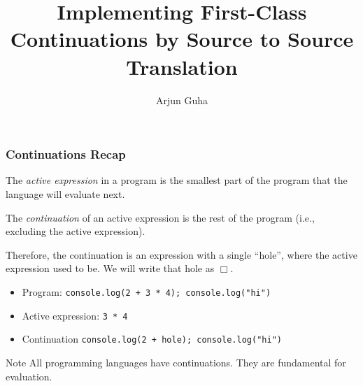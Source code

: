 \documentclass[8pt,pdf,handout]{beamer}
\begin{document}

\title{Implementing First-Class Continuations by Source to Source Translation}
\author{\large Arjun Guha}
\date{}

\begin{frame}
\titlepage
\end{frame}

\begin{frame}[fragile]
\frametitle{Continuations Recap}

\begin{definition}
The \emph{active expression} in a program is the smallest part of the
program that the language will evaluate next.
\end{definition}
  
\begin{definition}
The \emph{continuation} of an active expression is the rest of the program (i.e.,
excluding the active expression).
\end{definition}

Therefore, the continuation is an expression with a single ``hole'', where
the active expression used to be. We will write that hole as $\Box$.

\begin{itemize}
  
  \item Program: \lstinline|console.log(2 + 3 * 4); console.log("hi")|
  \item Active expression: \lstinline|3 * 4|
  \item Continuation \lstinline|console.log(2 + hole); console.log("hi")|

\end{itemize}
\begin{alertblock}{Note}
All programming languages have continuations. They are fundamental
for evaluation.
\end{alertblock}

\end{frame}
\end{document}
